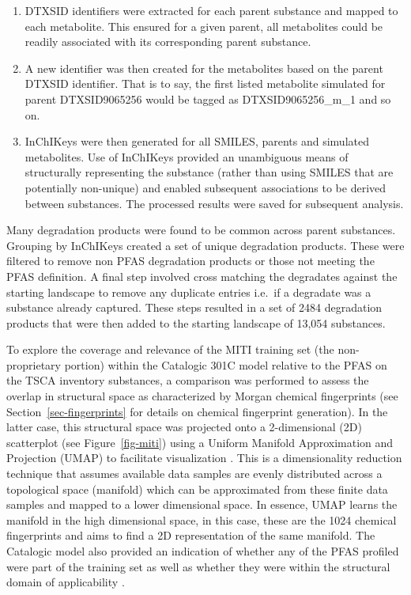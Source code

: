 \documentclass[
  super,
  preprint,
  3p]{elsarticle}
\providecommand{\tightlist}{%
  \setlength{\itemsep}{0pt}\setlength{\parskip}{0pt}}\usepackage{longtable,booktabs,array}
\begin{document}
\begin{enumerate}
\def\labelenumi{\arabic{enumi}.}
\tightlist
\item
  DTXSID identifiers were extracted for each parent substance and mapped
  to each metabolite. This ensured for a given parent, all metabolites
  could be readily associated with its corresponding parent substance.
\item
  A new identifier was then created for the metabolites based on the
  parent DTXSID identifier. That is to say, the first listed metabolite
  simulated for parent DTXSID9065256 would be tagged as
  DTXSID9065256\_m\_1 and so on.
\item
  InChIKeys were then generated for all SMILES, parents and simulated
  metabolites. Use of InChIKeys provided an unambiguous means of
  structurally representing the substance (rather than using SMILES that
  are potentially non-unique) and enabled subsequent associations to be
  derived between substances. The processed results were saved for
  subsequent analysis.
\end{enumerate}

Many degradation products were found to be common across parent
substances. Grouping by InChIKeys created a set of unique degradation
products. These were filtered to remove non PFAS degradation products or
those not meeting the PFAS definition. A final step involved cross
matching the degradates against the starting landscape to remove any
duplicate entries i.e.~if a degradate was a substance already captured.
These steps resulted in a set of 2484 degradation products that were
then added to the starting landscape of 13,054 substances.

To explore the coverage and relevance of the MITI training set (the
non-proprietary portion) within the Catalogic 301C model relative to the
PFAS on the TSCA inventory substances, a comparison was performed to
assess the overlap in structural space as characterized by Morgan
chemical fingerprints \citep{rogers_extended-connectivity_2010} (see
Section~\ref{sec-fingerprints} for details on chemical fingerprint
generation). In the latter case, this structural space was projected
onto a 2-dimensional (2D) scatterplot (see Figure~\ref{fig-miti}) using
a Uniform Manifold Approximation and Projection (UMAP) to facilitate
visualization \citep{mcinnes2020umap}. This is a dimensionality
reduction technique that assumes available data samples are evenly
distributed across a topological space (manifold) which can be
approximated from these finite data samples and mapped to a lower
dimensional space. In essence, UMAP learns the manifold in the high
dimensional space, in this case, these are the 1024 chemical
fingerprints and aims to find a 2D representation of the same manifold.
The Catalogic model also provided an indication of whether any of the
PFAS profiled were part of the training set as well as whether they were
within the structural domain of applicability \citep{dimitrov_2005}.
\end{document}
